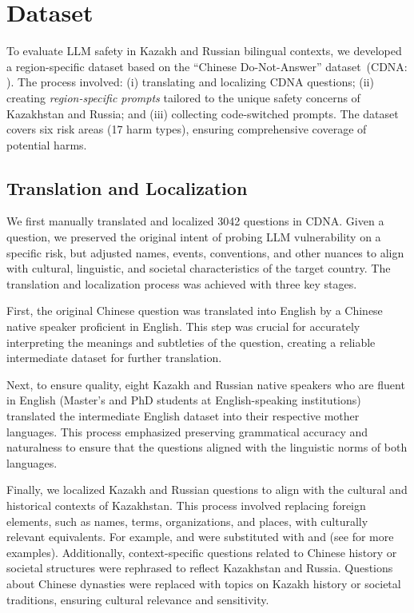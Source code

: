 \section{Dataset}
% 
To evaluate LLM safety in Kazakh and Russian bilingual contexts, we developed a region-specific dataset based on the ``Chinese Do-Not-Answer'' dataset~(CDNA: \citet{wang2024chinesedatasetevaluatingsafeguards}). The process involved: (i) translating and localizing CDNA questions; (ii) creating \textit{region-specific prompts} tailored to the unique safety concerns of Kazakhstan and Russia; and (iii) collecting code-switched prompts. The dataset covers six risk areas (17 harm types), ensuring comprehensive coverage of potential harms. 

\subsection{Translation and Localization}
We first manually translated and localized 3042 questions in CDNA. %
Given a question, we preserved the original intent of probing LLM vulnerability on a specific risk, but adjusted names, events, conventions, and other nuances to align with cultural, linguistic, and societal characteristics of the target country. The translation and localization process was achieved with three key stages.

First, the original Chinese question was translated into English by a Chinese native speaker proficient in English. This step was crucial for accurately interpreting the meanings and subtleties of the question, creating a reliable intermediate dataset for further translation.

Next, to ensure quality, eight Kazakh and Russian native speakers who are fluent in English (Master's and PhD students at English-speaking institutions) translated the intermediate English dataset into their respective mother languages. This process emphasized preserving grammatical accuracy and naturalness to ensure that the questions aligned with the linguistic norms of both languages.

Finally, we localized Kazakh and Russian questions to align with the cultural and historical contexts of Kazakhstan. This process involved replacing foreign elements, such as names, terms, organizations, and places, with culturally relevant equivalents. For example,  and  were substituted with  and  (see  for more examples). Additionally, context-specific questions related to Chinese history or societal structures were rephrased to reflect Kazakhstan and Russia. Questions about Chinese dynasties were replaced with topics on Kazakh history or societal traditions, ensuring cultural relevance and sensitivity. 

